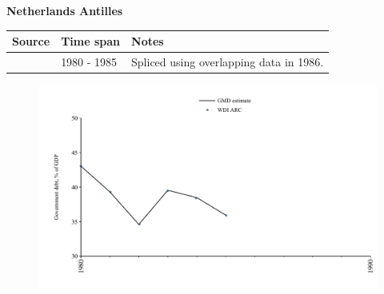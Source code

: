 \documentclass[12pt,a4paper,landscape]{article}
\begin{document}
\begin{adjustbox}{max totalsize={\paperwidth}{\paperheight},center}
\begin{minipage}[t][\textheight][t]{\textwidth}
\vspace*{0.5cm}
{}
\begin{center}
{\Large\bfseries Netherlands Antilles}
\end{center}
\vspace{0.5cm}
\begin{table}[H]
\centering
\small
\begin{tabular}{|l|l|l|}
\hline
\textbf{Source} & \textbf{Time span} & \textbf{Notes} \\
\hline
\rowcolor{white}\cite{WDI_ARC}& 1980 - 1985 &Spliced using overlapping data in 1986.\\
\hline
\end{tabular}
\end{table}
\begin{figure}[H]
\centering
\includegraphics[width=\textwidth,height=0.6\textheight,keepaspectratio]{graphs/ANT_govdebt_GDP.pdf}
\end{figure}
\end{minipage}
\end{adjustbox}
\end{document}
